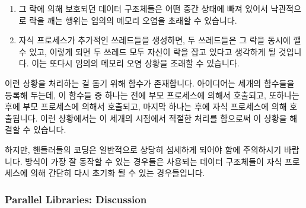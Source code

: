 \begin{enumerate}
\item	그 락에 의해 보호되던 데이터 구조체들은 어떤 중간 상태에 빠져 있어서
	낙관적으로 락을 깨는 행위는 임의의 메모리 오염을 초래할 수 있습니다.
\item	자식 프로세스가 추가적인 쓰레드들을 생성하면, 두 쓰레드들은 그 락을
	동시에 깰 수 있고, 이렇게 되면 두 쓰레드 모두 자신이 락을 잡고 있다고
	생각하게 될 것입니다.
	이는 또다시 임의의 메모리 오염 상황을 초래할 수 있습니다.

\end{enumerate}

이런 상황을 처리하는 걸 돕기 위해  함수가 존재합니다.
아이디어는 세개의 함수들을 등록해 두는데, 이 함수들 중 하나는  전에
부모 프로세스에 의해서 호출되고, 또하나는  후에 부모 프로세스에
의해서 호출되고, 마지막 하나는  후에 자식 프로세스에 의해
호출됩니다.
이런 상황에서는 이 세개의 시점에서 적절한 처리를 함으로써 이 상황을 해결할 수
있습니다.

하지만,  핸들러들의 코딩은 일반적으로 상당히 섬세하게 되어야 함에
주의하시기 바랍니다.
 방식이 가장 잘 동작할 수 있는 경우들은 사용되는 데이터 구조체들이
자식 프로세스에 의해 간단히 다시 초기화 될 수 있는 경우들입니다.

\subsubsection{Parallel Libraries: Discussion}
\label{sec:locking:Parallel Libraries: Discussion}

